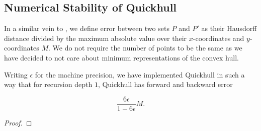 \subsection{Numerical Stability of Quickhull}

In a similar vein to \cite{Jiang06}, we define error between two sets
$P$ and $P'$ as their Hausdorff distance divided by the maximum absolute
value over their $x$-coordinates and $y$-coordinates $M$. We do not require
the number of points to be the same as we have decided to not care about
minimum representations of the convex hull.

\begin{theorem}
    Writing $\epsilon$ for the machine precision, we have implemented
    Quickhull in such a way that for recursion depth $1$, Quickhull has
    forward and backward error 

    $$\frac{6\epsilon}{1 - 6\epsilon}M.$$
\end{theorem}

\begin{proof}

\end{proof}
